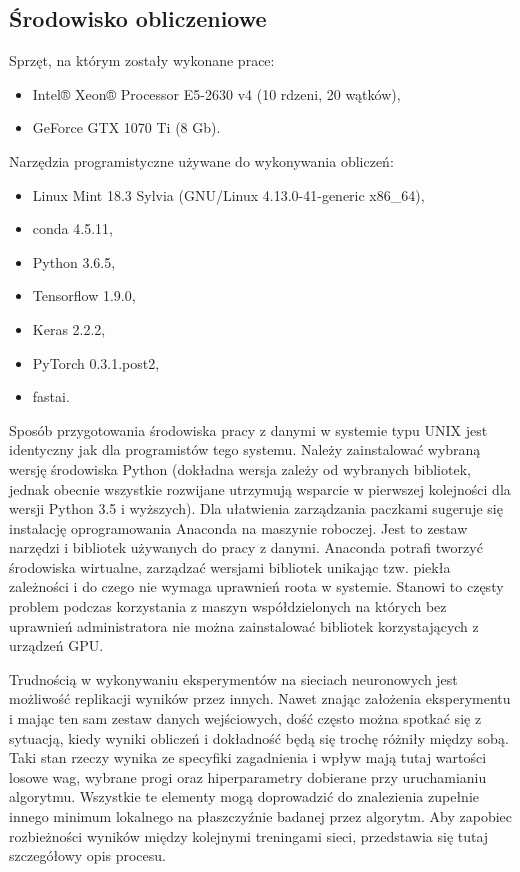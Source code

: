 \documentclass[12pt,a4paper,twoside,titlepage,openright]{book}
\begin{document}
\subsection{Środowisko obliczeniowe}
Sprzęt, na którym zostały wykonane prace:
\begin{itemize}
\item Intel® Xeon® Processor E5-2630 v4 (10 rdzeni, 20 wątków),
\item GeForce GTX 1070 Ti (8 Gb).
\end{itemize}

Narzędzia programistyczne używane do wykonywania obliczeń:
\begin{itemize}
\item Linux Mint 18.3 Sylvia (GNU/Linux 4.13.0-41-generic x86\_64),
\item conda 4.5.11,
\item Python 3.6.5,
\item Tensorflow 1.9.0,
\item Keras 2.2.2,
\item PyTorch 0.3.1.post2,
\item fastai.
\end{itemize}

Sposób przygotowania środowiska pracy z danymi w systemie typu UNIX jest identyczny jak dla programistów tego systemu. Należy zainstalować wybraną wersję środowiska Python (dokładna wersja zależy od wybranych bibliotek, jednak obecnie wszystkie rozwijane utrzymują wsparcie w pierwszej kolejności dla wersji Python 3.5 i wyższych). Dla ułatwienia zarządzania paczkami sugeruje się instalację oprogramowania Anaconda na maszynie roboczej. Jest to zestaw narzędzi i bibliotek używanych do pracy z danymi. Anaconda potrafi tworzyć środowiska wirtualne, zarządzać wersjami bibliotek unikając tzw. piekła zależności i do czego nie wymaga uprawnień roota w systemie. Stanowi to częsty problem podczas korzystania z maszyn współdzielonych na których bez uprawnień administratora nie można zainstalować bibliotek korzystających z urządzeń GPU.

Trudnością  w wykonywaniu eksperymentów na sieciach neuronowych jest możliwość replikacji wyników przez innych. Nawet znając założenia eksperymentu i mając ten sam zestaw danych wejściowych, dość często można spotkać się z sytuacją, kiedy wyniki obliczeń i dokładność będą się trochę różniły między sobą. Taki stan rzeczy wynika ze specyfiki zagadnienia i wpływ mają tutaj wartości losowe wag, wybrane progi oraz hiperparametry dobierane przy uruchamianiu algorytmu. Wszystkie te elementy mogą doprowadzić do znalezienia zupełnie innego minimum lokalnego na płaszczyźnie badanej przez algorytm. Aby zapobiec rozbieżności wyników między kolejnymi treningami sieci, przedstawia się tutaj szczegółowy opis procesu.
\end{document}
